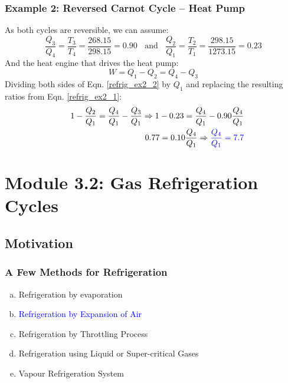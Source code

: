 \documentclass[10pt,compress]{beamer}
\newcommand{\frc}{\displaystyle\frac}
\begin{document}
\begin{frame}
 \frametitle{Example 2: Reversed Carnot Cycle -- Heat Pump}

As both cycles are reversible, we can assume:
\begin{equation}
\frc{Q_{3}}{Q_{4}} = \frc{T_{3}}{T_{4}} = \frc{268.15}{298.15}= 0.90 \;\;\text{ and }\;\; \frc{Q_{2}}{Q_{1}}=\frc{T_{2}}{T_{1}} = \frc{298.15}{1273.15}=0.23 \label{refrig_ex2_1}
\end{equation}
And the heat engine that drives the heat pump: 
\begin{equation}
W=Q_{1}-Q_{2}=Q_{4}-Q_{3} \label{refrig_ex2_2}
\end{equation}
Dividing both sides of Eqn. \ref{refrig_ex2_2} by $Q_{1}$ and replacing the resulting ratios from Eqn. \ref{refrig_ex2_1}:
\begin{eqnarray}
&& 1 - \frc{Q_{2}}{Q_{1}} = \frc{Q_{4}}{Q_{1}}-\frc{Q_{3}}{Q_{1}} \Rightarrow 1-0.23 = \frc{Q_{4}}{Q_{1}}-0.90\frc{Q_{4}}{Q_{1}} \nonumber \\
&& 0.77 = 0.10 \frc{Q_{4}}{Q_{1}} \Rightarrow \textcolor{blue}{\frc{Q_{4}}{Q_{1}}=7.7} \nonumber
\end{eqnarray}


\end{frame}



\section{Module 3.2: Gas Refrigeration Cycles}




\subsection{Motivation}
\begin{frame}
 \frametitle{A Few Methods for Refrigeration}
  \begin{enumerate}[(a)]
   \item  Refrigeration by evaporation
   \item \textcolor{blue}{Refrigeration by Expansion of Air}
   \item  Refrigeration by Throttling Process
   \item  Refrigeration using Liquid or Super-critical Gases
   \item  Vapour Refrigeration System
  \end{enumerate}
\end{frame}
\end{document}
